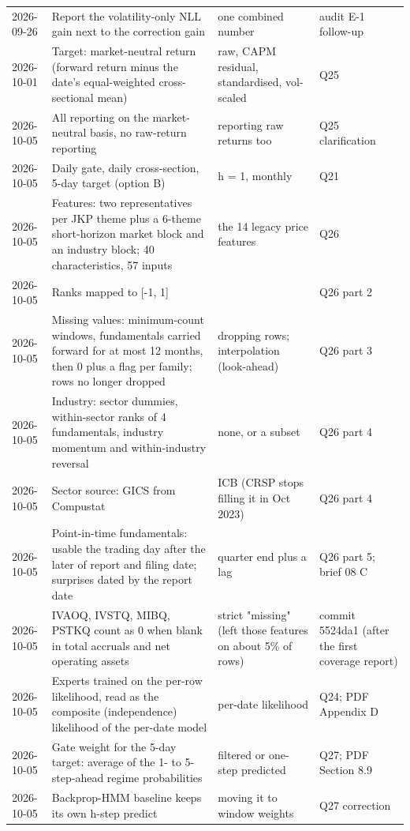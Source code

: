 {\begin{longtable}{@{}p{1.55cm}>{\raggedright\arraybackslash}p{6.6cm}>{\raggedright\arraybackslash}p{4.2cm}>{\raggedright\arraybackslash}p{2.6cm}@{}}
2026-09-26 & Report the volatility-only NLL gain next to the correction gain & one combined number & audit E-1 follow-up\\
2026-10-01 & Target: market-neutral return (forward return minus the date's equal-weighted cross-sectional mean) & raw, CAPM residual, standardised, vol-scaled & Q25\\
2026-10-05 & All reporting on the market-neutral basis, no raw-return reporting & reporting raw returns too & Q25 clarification\\
2026-10-05 & Daily gate, daily cross-section, 5-day target (option B) & h = 1, monthly & Q21\\
2026-10-05 & Features: two representatives per JKP theme plus a 6-theme short-horizon market block and an industry block; 40 characteristics, 57 inputs & the 14 legacy price features & Q26\\
2026-10-05 & Ranks mapped to [-1, 1] & [-0.5, 0.5] & Q26 part 2\\
2026-10-05 & Missing values: minimum-count windows, fundamentals carried forward for at most 12 months, then 0 plus a flag per family; rows no longer dropped & dropping rows; interpolation (look-ahead) & Q26 part 3\\
2026-10-05 & Industry: sector dummies, within-sector ranks of 4 fundamentals, industry momentum and within-industry reversal & none, or a subset & Q26 part 4\\
2026-10-05 & Sector source: GICS from Compustat & ICB (CRSP stops filling it in Oct 2023) & Q26 part 4\\
2026-10-05 & Point-in-time fundamentals: usable the trading day after the later of report and filing date; surprises dated by the report date & quarter end plus a lag & Q26 part 5; brief 08 C\\
2026-10-05 & IVAOQ, IVSTQ, MIBQ, PSTKQ count as 0 when blank in total accruals and net operating assets & strict "missing" (left those features on about 5\% of rows) & commit 5524da1 (after the first coverage report)\\
2026-10-05 & Experts trained on the per-row likelihood, read as the composite (independence) likelihood of the per-date model & per-date likelihood & Q24; PDF Appendix D\\
2026-10-05 & Gate weight for the 5-day target: average of the 1- to 5-step-ahead regime probabilities & filtered or one-step predicted & Q27; PDF Section 8.9\\
2026-10-05 & Backprop-HMM baseline keeps its own h-step predict & moving it to window weights & Q27 correction\\

\end{longtable}}
